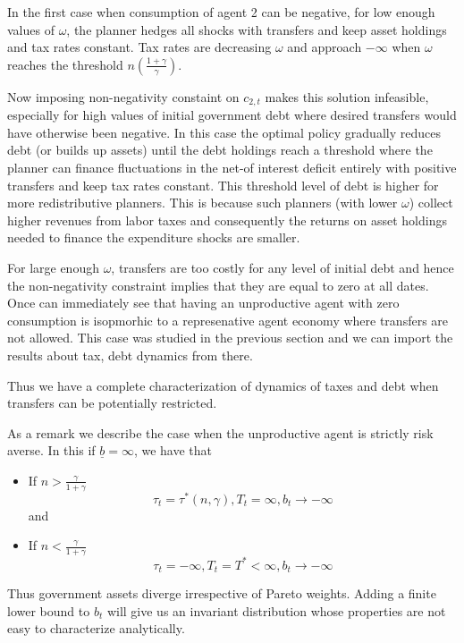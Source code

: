 \documentclass[thmsb,11pt]{article}
\begin{document}
In the first case when consumption of agent 2 can be  negative, for low enough values of $\omega$, the planner hedges all shocks with transfers and keep asset holdings and tax rates constant.  Tax rates are decreasing $\omega$ and approach $-\infty$ when $\omega$ reaches the threshold $n\left(\frac{1+\gamma}{\gamma}\right).$




Now imposing non-negativity constaint on $c_{2,t}$ makes this solution infeasible, especially for high values of initial government debt where desired transfers would have otherwise been negative. In this case the optimal policy gradually reduces debt (or builds up assets) until the debt holdings reach a threshold where the planner can finance fluctuations in the net-of interest deficit entirely with positive transfers and keep tax rates constant. This threshold level of debt is higher for more  redistributive planners. This is because such planners (with lower $\omega$)  collect higher revenues from labor taxes and consequently the returns on asset holdings needed to finance the expenditure shocks are smaller. 

For large enough $\omega$, transfers are too costly for any level of initial debt and hence the non-negativity constraint implies that they are equal to zero at all dates. Once can immediately see that having an unproductive agent with zero consumption is isopmorhic to a represenative agent economy where transfers are not allowed. This case was studied in the previous section and we can import the results about tax, debt dynamics from there. 

Thus we have a complete characterization of dynamics of taxes and debt when transfers can be potentially restricted.




As a remark we describe the case when the unproductive agent is strictly risk averse. In this  if $\underline{b}=\infty$, we have that

\begin{itemize}
\item If $n>\frac{\gamma}{1+\gamma}$
\[\tau_t=\tau^*(n,\gamma),T_t=\infty,b_t\to -\infty\]
and
\item If $n<\frac{\gamma}{1+\gamma}$
\[\tau_t=-\infty,T_t=T^*<\infty,b_t\to -\infty\]
\end{itemize}

Thus government assets diverge irrespective of Pareto weights. Adding a finite lower bound to $b_t$ will give us an invariant distribution whose properties are not easy to characterize analytically.
\end{document}
